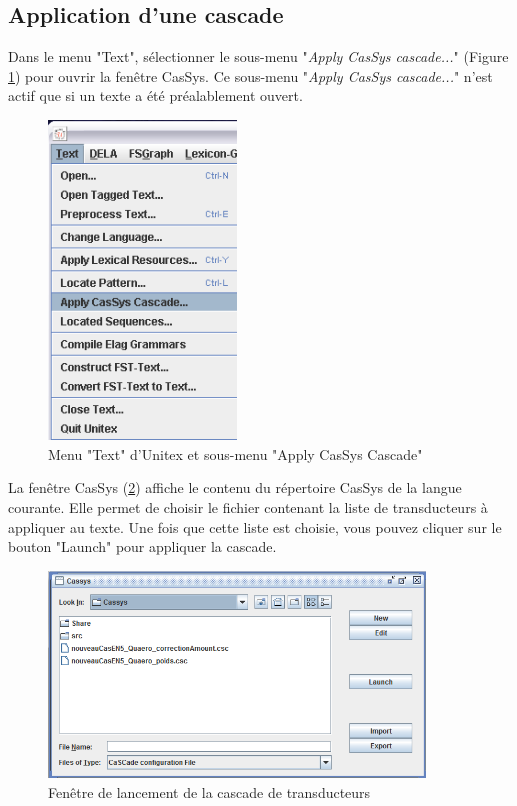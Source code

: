 	

\subsection{Application d'une cascade}
\label{subsec:launchCascade}

Dans le menu "Text", sélectionner le sous-menu "\textit{Apply CasSys cascade...}" (Figure \ref{fig13-01}) pour ouvrir la fenêtre CasSys.
Ce sous-menu "\textit{Apply CasSys cascade...}" n'est actif que si un texte a été préalablement ouvert.

\begin{figure}[!htb]
 \centering
 \includegraphics[width=5cm]{resources/img/fig13-01.png}
 \caption{Menu "Text" d'Unitex et sous-menu "Apply CasSys Cascade"}
 \label{fig13-01}
\end{figure}

La fenêtre CasSys (\ref{fig13-02}) affiche le contenu du répertoire CasSys de la langue courante. Elle
permet de choisir le fichier contenant la liste de transducteurs à appliquer au texte. Une fois que cette liste
est choisie, vous pouvez cliquer sur le bouton "Launch" pour appliquer la cascade.

\begin{figure}[!htb]
  \centering
  \includegraphics[width=10cm]{resources/img/fig13-02.png}
  \caption{Fenêtre de lancement de la cascade de transducteurs}
  \label{fig13-02}
\end{figure}

